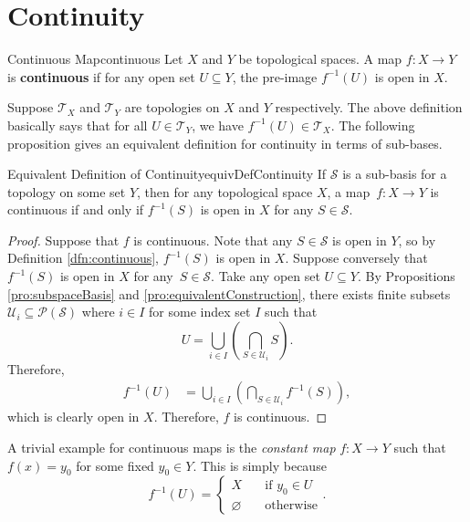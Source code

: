 \documentclass[math]{amznotes}
\theoremstyle{remark}
\begin{document}
\section{Continuity}
\begin{dfnbox}{Continuous Map}{continuous}
    Let $X$ and $Y$ be topological spaces. A map $f \colon X \to Y$ is {\color{red} \textbf{continuous}} if for any open set $U \subseteq Y$, the pre-image $f^{-1}\left(U\right)$ is open in $X$.
\end{dfnbox}
Suppose $\mathcal{T}_X$ and $\mathcal{T}_Y$ are topologies on $X$ and $Y$ respectively. The above definition basically says that for all $U \in \mathcal{T}_Y$, we have $f^{-1}\left(U\right) \in \mathcal{T}_X$. The following proposition gives an equivalent definition for continuity in terms of sub-bases.
\begin{probox}{Equivalent Definition of Continuity}{equivDefContinuity}
    If $\mathcal{S}$ is a sub-basis for a topology on some set $Y$, then for any topological space $X$, a map~$f \colon X \to Y$ is continuous if and only if $f^{-1}\left(S\right)$ is open in $X$ for any $S \in \mathcal{S}$.
    \tcblower
    \begin{proof}
        Suppose that $f$ is continuous. Note that any $S \in \mathcal{S}$ is open in $Y$, so by Definition \ref{dfn:continuous}, $f^{-1}\left(S\right)$ is open in $X$. Suppose conversely that $f^{-1}\left(S\right)$ is open in $X$ for any~$S \in \mathcal{S}$. Take any open set $U \subseteq Y$. By Propositions \ref{pro:subspaceBasis} and \ref{pro:equivalentConstruction}, there exists finite subsets $\mathcal{U}_i \subseteq \mathcal{P}\left(\mathcal{S}\right)$ where $i \in I$ for some index set $I$ such that 
        \begin{equation*}
            U = \bigcup_{i \in I}\left(\bigcap_{S \in \mathcal{U}_i}S\right).
        \end{equation*}
        Therefore,
        \begin{align*}
            f^{-1}\left(U\right) & = \bigcup_{i \in I}\left(\bigcap_{S \in \mathcal{U}_i}f^{-1}\left(S\right)\right),
        \end{align*}
        which is clearly open in $X$. Therefore, $f$ is continuous.
    \end{proof}
\end{probox}
A trivial example for continuous maps is the \textit{constant map} $f \colon X \to Y$ such that $f\left(x\right) = y_0$ for some fixed $y_0 \in Y$. This is simply because 
\begin{equation*}
    f^{-1}\left(U\right) = \begin{cases}
        X & \quad\textrm{if } y_0 \in U \\
        \varnothing & \quad\textrm{otherwise}
    \end{cases}.
\end{equation*}
\end{document}
